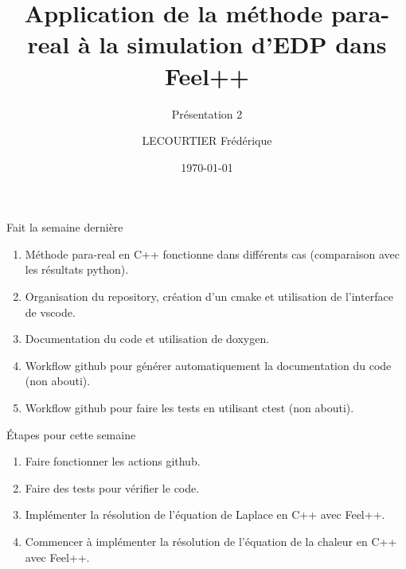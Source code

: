 \documentclass[10pt,xcolor={table,dvipsnames},t]{beamer}
\title[Lorenz]{Application de la méthode para-real à la simulation d'EDP dans Feel++}
\subtitle{Présentation 2}
\author[name]{LECOURTIER Frédérique}
\institute{\large Université de Strasbourg}
\date{\today}
\begin{document}
	
	\begin{frame}
		\titlepage
	\end{frame}
	
	\AtBeginSection[]{
		\begin{frame}
			\vfill
			\centering
			\begin{beamercolorbox}[sep=5pt,shadow=true,rounded=true]{subtitle}
				\usebeamerfont{title}\insertsectionhead\par%
			\end{beamercolorbox}
			\vfill
		\end{frame}
	}
	
	\begin{frame}{Fait la semaine dernière}
		\begin{enumerate}[\textbullet]
			\item Méthode para-real en C++ fonctionne dans différents cas (comparaison avec les résultats python).
			\item Organisation du repository, création d'un cmake et utilisation de l'interface de vscode.
			\item Documentation du code et utilisation de doxygen. \\ \;
			\item Workflow github pour générer automatiquement la documentation du code (non abouti).
			\item Workflow github pour faire les tests en utilisant ctest (non abouti).
		\end{enumerate}
	\end{frame}
	
	\begin{frame}{Étapes pour cette semaine}
		\begin{enumerate}[\textbullet]
			\item Faire fonctionner les actions github.
			\item Faire des tests pour vérifier le code. \\ \;
			\item Implémenter la résolution de l'équation de Laplace en C++ avec Feel++.
			\item Commencer à implémenter la résolution de l'équation de la chaleur en C++ avec Feel++.
		\end{enumerate}
	\end{frame}
	
	
\end{document}
